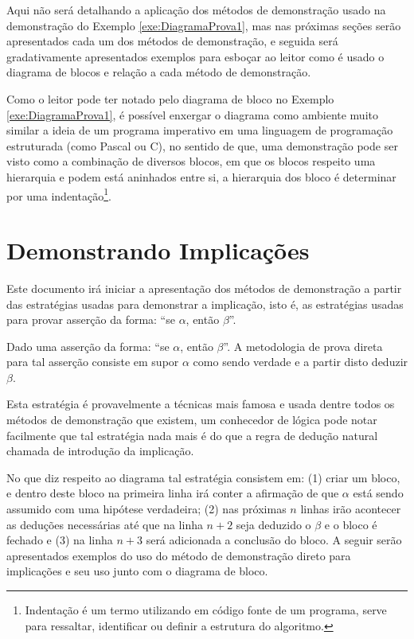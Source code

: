 Aqui não será detalhando a aplicação dos métodos de demonstração usado na demonstração do Exemplo \ref{exe:DiagramaProva1}, mas nas próximas seções serão apresentados cada um dos métodos de demonstração, e seguida será gradativamente apresentados exemplos para esboçar ao leitor como é usado o diagrama de blocos e relação a cada método de demonstração.

Como o leitor pode ter notado pelo diagrama de bloco no Exemplo \ref{exe:DiagramaProva1}, é possível enxergar o diagrama como ambiente muito similar a ideia de um programa imperativo em uma linguagem de programação estruturada (como Pascal ou C), no sentido de que, uma demonstração pode ser visto como a combinação de diversos blocos, em que os blocos respeito uma hierarquia e podem está aninhados entre si, a hierarquia dos bloco é determinar por uma indentação\footnote{Indentação é um termo utilizando em código fonte de um programa, serve para ressaltar, identificar ou definir a estrutura do algoritmo.}.

\section{Demonstrando Implicações}\label{sec:DemonstrandoImplicacoes}

Este documento irá iniciar a apresentação dos métodos de demonstração a partir das estratégias usadas para demonstrar a implicação, isto é, as estratégias usadas para provar asserção da forma: ``se $\alpha$, então $\beta$''.

\begin{definicao}
	Dado uma asserção da forma: ``se $\alpha$, então $\beta$''. A metodologia de prova direta para tal asserção consiste em supor $\alpha$ como sendo verdade e a partir disto deduzir $\beta$.
\end{definicao}

Esta estratégia é provavelmente a técnicas mais famosa e usada dentre todos os métodos de demonstração que existem, um conhecedor de lógica pode notar facilmente que tal estratégia nada mais é do que a regra de dedução natural chamada de introdução da implicação\cite{joaoPavao2014}.

No que diz respeito ao diagrama tal estratégia consistem em: (1) criar um bloco, e dentro deste bloco na primeira linha irá conter a afirmação de que $\alpha$ está sendo assumido com uma hipótese verdadeira; (2) nas próximas $n$ linhas irão acontecer as deduções necessárias até que na linha $n+2$ seja deduzido o $\beta$ e o bloco é fechado e (3) na linha $n + 3$ será adicionada a conclusão do bloco. A seguir serão apresentados exemplos do uso do método de demonstração direto para implicações e seu uso junto com o diagrama de bloco.

